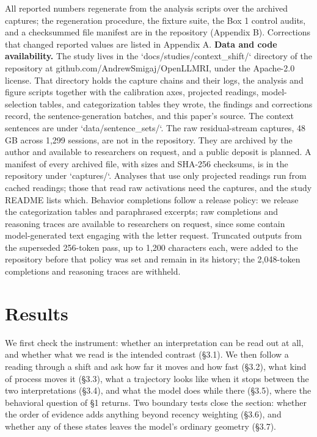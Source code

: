 \documentclass[11pt]{article}
\begin{document}
All reported numbers regenerate from the analysis scripts over the archived captures;
the regeneration procedure, the fixture suite, the Box 1 control audits, and a
checksummed file manifest are in the repository (Appendix B). Corrections that changed
reported values are listed in Appendix A. \textbf{Data and code availability.} The study lives in the
`docs/studies/context\_shift/` directory of the repository at
github.com/AndrewSmigaj/OpenLLMRI, under the Apache-2.0 license. That directory
holds the capture chains and their logs, the analysis and figure scripts together
with the calibration axes, projected readings, model-selection tables, and
categorization tables they wrote, the findings and corrections record, the
sentence-generation batches, and this paper's source. The context sentences are
under `data/sentence\_sets/`. The raw residual-stream captures, 48 GB across 1,299 sessions, are not in the
repository. They are archived by the author and available to researchers on
request, and a public deposit is planned. A manifest of every archived file, with
sizes and SHA-256 checksums, is in the repository under `captures/`. Analyses that use only projected readings run from
cached readings; those that read raw activations need the captures, and the
study README lists which. Behavior completions follow a release policy: we release the categorization tables and paraphrased excerpts; raw completions and reasoning traces are available to researchers on request, since some contain model-generated text engaging with the letter request. Truncated outputs from the superseded 256-token pass, up to 1,200 characters each, were added to the repository before that policy was set and remain in its history; the 2,048-token completions and reasoning traces are withheld.
\FloatBarrier

\section{Results}

We first check the instrument: whether an interpretation can be read out at all, and
whether what we read is the intended contrast (\S3.1). We then follow a reading through
a shift and ask how far it moves and how fast (\S3.2), what kind of process moves it
(\S3.3), what a trajectory looks like when it stops between the two interpretations
(\S3.4), and what the model does while there (\S3.5), where the behavioral question of \S1
returns. Two boundary tests close the section: whether the order of evidence adds anything beyond recency weighting (\S3.6),
and whether any of these states leaves the model's ordinary geometry (\S3.7).
\end{document}
